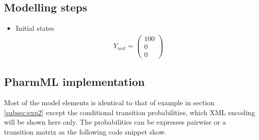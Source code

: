 \subsection*{Modelling steps}

\begin{itemize}
\item
Initial states
\begin{align}
& Y_{init} = \left( \begin{array}{c} 100 \\ 0 \\ 0 \end{array} \right) \nonumber
\end{align}
\end{itemize}

\subsection*{PharmML implementation}
Most of the model elements is identical to that of example in section \ref{subsec:exp2}
except the conditional transition probabilities, which XML encoding will be shown
here only.  The probabilities can be expresses pairwise or a transition matrix as the following 
code snippet show.

